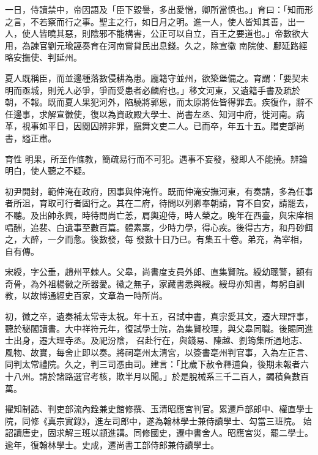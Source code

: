 \begin{pinyinscope}
 一日，侍讀禁中，帝因語及「臣下毀譽，多出愛憎，卿所當慎也。」育曰：「知而形之言，不若察而行之事。聖主之行，如日月之明。進一人，使人皆知其善，出一人，使人皆曉其惡，則陰邪不能構害，公正可以自立，百王之要道也。」帝數欲大用，為諫官劉元瑜誣奏育在河南嘗貸民出息錢。久之，除宣徽
 南院使、鄜延路經略安撫使、判延州。



 夏人既稱臣，而並邊種落數侵耕為患。龐籍守並州，欲築堡備之。育謂：「要契未明而亟城，則羌人必爭，爭而受患者必麟府也。」移文河東，又遺籍手書及疏於朝，不報。既而夏人果犯河外，陷驍將郭恩，而太原將佐皆得罪去。疾復作，辭不任邊事，求解宣徽使，復以為資政殿大學士、尚書左丞、知河中府，徙河南。病革，視事如平日，因閱囚辨非罪，竄舞文吏二人。已而卒，年五十五。贈吏部尚書，謚正肅。



 育性
 明果，所至作條教，簡疏易行而不可犯。遇事不妄發，發即人不能撓。辨論明白，使人聽之不疑。



 初尹開封，範仲淹在政府，因事與仲淹忤。既而仲淹安撫河東，有奏請，多為任事者所沮，育取可行者固行之。其在二府，待問以列卿奉朝請，育不自安，請罷去，不聽。及出帥永興，時待問尚亡恙，肩輿迎侍，時人榮之。晚年在西臺，與宋庠相唱酬，追裴、白遺事至數百篇。體素羸，少時力學，得心疾。後得古方，和丹砂餌之，大醉，一夕而愈。後數發，每
 發數十日乃已。有集五十卷。弟充，為宰相，自有傳。



 宋綬，字公垂，趙州平棘人。父皋，尚書度支員外郎、直集賢院。綬幼聰警，額有奇骨，為外祖楊徽之所器愛。徽之無子，家藏書悉與綬。綬母亦知書，每躬自訓教，以故博通經史百家，文章為一時所尚。



 初，徽之卒，遺奏補太常寺太祝。年十五，召試中書，真宗愛其文，遷大理評事，聽於秘閣讀書。大中祥符元年，復試學士院，為集賢校理，與父皋同職。後賜同進士出身，遷大理寺丞。及祀汾陰，
 召赴行在，與錢易、陳越、劉筠集所過地志、風物、故實，每舍止即以奏。將祠亳州太清宮，以簽書亳州判官事，入為左正言、同判太常禮院。久之，判三司憑由司。建言：「比歲下赦令釋逋負，後期未報者六十八州。請於諸路選官考核，欺半月以聞。」於是脫械系三千二百人，蠲積負數百萬。



 擢知制誥、判吏部流內銓兼史館修撰、玉清昭應宮判官。累遷戶部郎中、權直學士院，同修《真宗實錄》，進左司郎中，遂為翰林學士兼侍讀學士、勾當三班院。
 始詔讀唐史，固求解三班以顓進講。同修國史，遷中書舍人。昭應宮災，罷二學士。逾年，復翰林學士。史成，遷尚書工部侍郎兼侍讀學士。




\end{pinyinscope}
